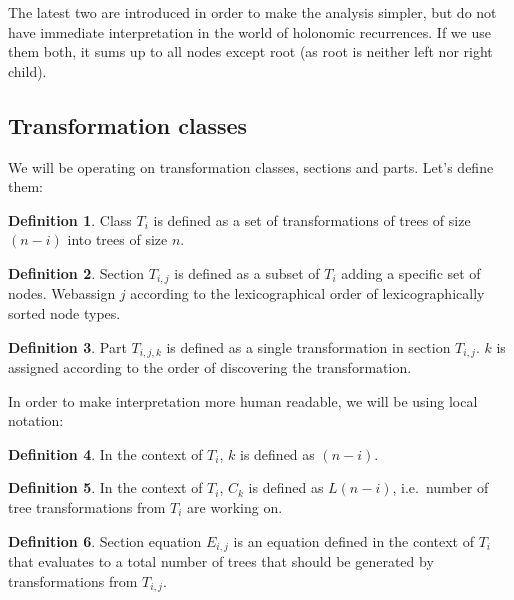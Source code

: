 \documentclass[final]{article}
\theoremstyle{definition}
\newtheorem{definition}{Definition}[subsection]
\theoremstyle{remark}
\begin{document}
The latest two are introduced in order to make the analysis simpler, but do not have immediate interpretation in the world of holonomic recurrences. If we use them both, it sums up to all nodes except root (as root is neither left nor right child).


\subsection{Transformation classes}%
\label{sub:transformation_classes}

We will be operating on transformation classes, sections and parts. Let's define them:

\begin{definition}
    Class \(T_i\) is defined as a set of transformations of trees of size \((n - i)\) into trees of size \(n\).
\end{definition}

\begin{definition}
    Section \(T_{i,j}\) is defined as a subset of \(T_i\) adding a specific set of nodes. Webassign \(j\) according to the lexicographical order of lexicographically sorted node types.
\end{definition}

\begin{definition}
    Part \(T_{i,j,k}\) is defined as a single transformation in section \(T_{i,j}\). \(k\) is assigned according to the order of discovering the transformation.
\end{definition}

In order to make interpretation more human readable, we will be using local notation:

\begin{definition}
    In the context of \(T_i\), \(k\) is defined as \((n - i)\).
\end{definition}

\begin{definition}
    In the context of \(T_i\), \(C_k\) is defined as \(L(n - i)\), i.e.\ number of tree transformations from \(T_i\) are working on.
\end{definition}

\begin{definition}
    Section equation \(E_{i, j}\) is an equation defined in the context of \(T_i\) that evaluates to a total number of trees that should be generated by transformations from \(T_{i, j}\).
\end{definition}
\end{document}
